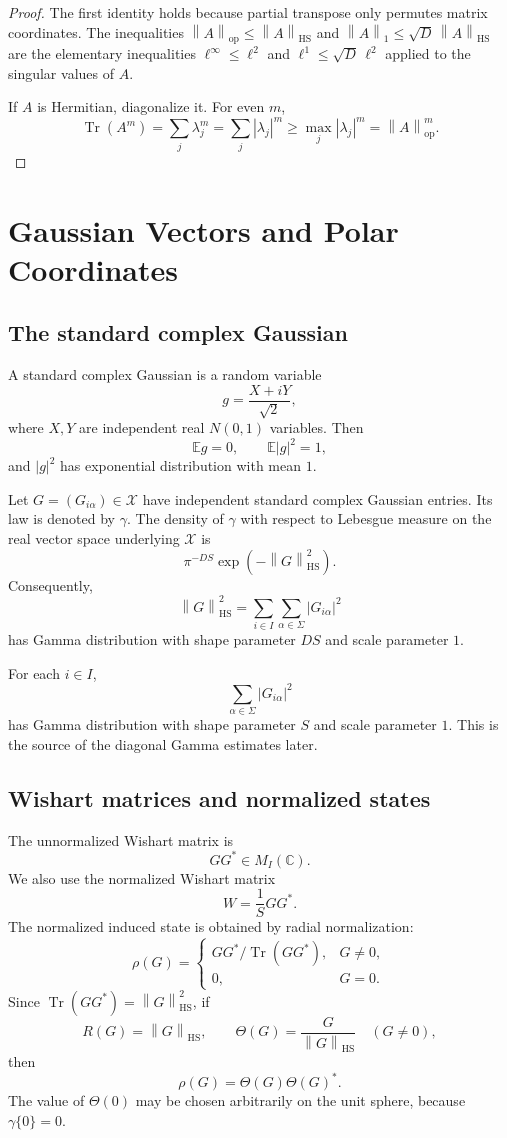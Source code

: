 \documentclass[11pt,oneside]{book}
\DeclareMathOperator{\Tr}{Tr}
\newcommand{\C}{\mathbb C}
\newcommand{\E}{\mathbb E}
\newcommand{\1}{\mathbf 1}
\newcommand{\HS}{\mathrm{HS}}
\newcommand{\op}{\mathrm{op}}
\newcommand{\norm}[1]{\left\|#1\right\|}
\begin{document}
\begin{proof}
The first identity holds because partial transpose only permutes matrix
coordinates.  The inequalities \(\norm A_{\op}\le\norm A_{\HS}\) and
\(\norm A_1\le\sqrt D\,\norm A_{\HS}\) are the elementary inequalities
\(\ell^\infty\le\ell^2\) and \(\ell^1\le\sqrt D\,\ell^2\) applied to the
singular values of \(A\).

If \(A\) is Hermitian, diagonalize it.  For even \(m\),
\[
  \Tr(A^m)=\sum_j\lambda_j^m=\sum_j|\lambda_j|^m
  \ge \max_j|\lambda_j|^m=\norm A_{\op}^m.
\]
\end{proof}

\chapter{Gaussian Vectors and Polar Coordinates}

\section{The standard complex Gaussian}

A standard complex Gaussian is a random variable
\[
  g=\frac{X+iY}{\sqrt2},
\]
where \(X,Y\) are independent real \(N(0,1)\) variables.  Then
\[
  \E g=0,\qquad \E |g|^2=1,
\]
and \(|g|^2\) has exponential distribution with mean \(1\).

Let \(G=(G_{i\alpha})\in\mathcal X\) have independent standard complex Gaussian
entries.  Its law is denoted by \(\gamma\).  The density of \(\gamma\) with
respect to Lebesgue measure on the real vector space underlying \(\mathcal X\)
is
\[
  \pi^{-DS}\exp(-\norm G_{\HS}^2).
\]
Consequently,
\[
  \norm G_{\HS}^2
  =
  \sum_{i\in I}\sum_{\alpha\in\Sigma}|G_{i\alpha}|^2
\]
has Gamma distribution with shape parameter \(DS\) and scale parameter \(1\).

For each \(i\in I\),
\[
  \sum_{\alpha\in\Sigma}|G_{i\alpha}|^2
\]
has Gamma distribution with shape parameter \(S\) and scale parameter \(1\).
This is the source of the diagonal Gamma estimates later.

\section{Wishart matrices and normalized states}

The unnormalized Wishart matrix is
\[
  GG^*\in M_I(\C).
\]
We also use the normalized Wishart matrix
\[
  W=\frac1S GG^*.
\]
The normalized induced state is obtained by radial normalization:
\[
  \rho(G)=
  \begin{cases}
    GG^*/\Tr(GG^*),&G\ne0,\\
    0,&G=0.
  \end{cases}
\]
Since \(\Tr(GG^*)=\norm G_{\HS}^2\), if
\[
  R(G)=\norm G_{\HS},
  \qquad
  \Theta(G)=\frac{G}{\norm G_{\HS}}\quad(G\ne0),
\]
then
\[
  \rho(G)=\Theta(G)\Theta(G)^*.
\]
The value of \(\Theta(0)\) may be chosen arbitrarily on the unit sphere,
because \(\gamma\{0\}=0\).
\end{document}
